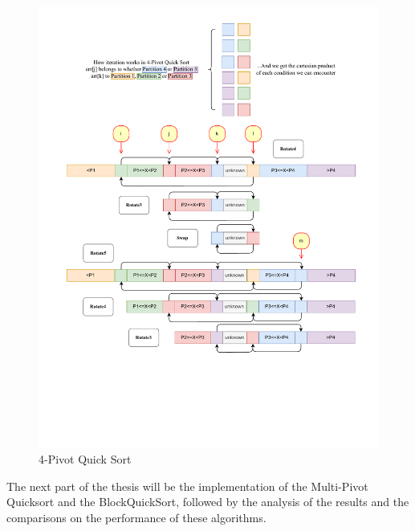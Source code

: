 \documentclass{article}
\begin{document}
\begin{figure}[H]
    \hypertarget{fig:4pivot}{}
    \caption{4-Pivot Quick Sort}
    \centering
    \hspace*{-0.25\textwidth}
    \includegraphics[width=1.5\textwidth]{4pivot.drawio.pdf}
\end{figure}




The next part of the thesis will be the implementation of the Multi-Pivot Quicksort and the BlockQuickSort,
followed by the analysis of the results and the comparisons on the performance of these algorithms.
\end{document}
